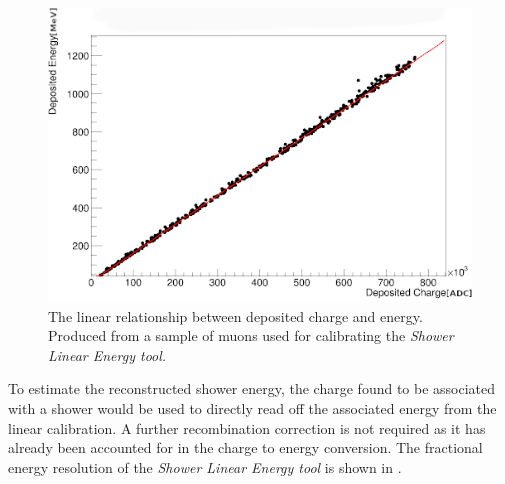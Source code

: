\newpage
\begin{figure}[h]
    \centering
    \includegraphics[width = \largefigwidth]{figures-chap4/linear_energy_lookup_curve1.png}
    \caption{The linear relationship between deposited charge and energy. Produced from a sample of muons used for calibrating the \textit{Shower Linear Energy tool.}}
    \label{fig:linear lookup curve}
\end{figure}



To estimate the reconstructed shower energy, the charge found to be associated with a shower would be used to directly read off the associated energy from the linear calibration. A further recombination correction is not required as it has already been accounted for in the charge to energy conversion. The fractional energy resolution of the \textit{Shower Linear Energy tool} is shown in . 

